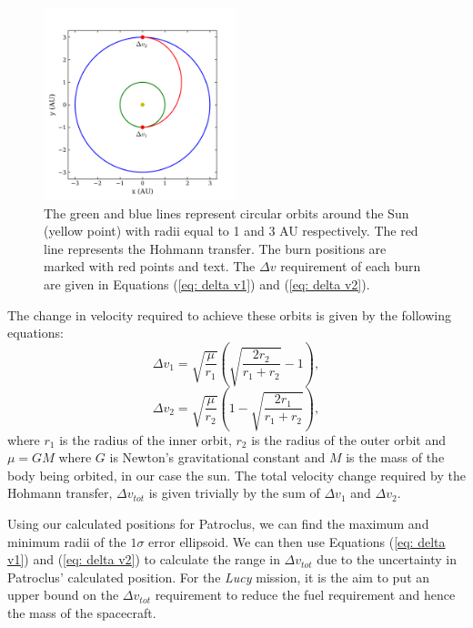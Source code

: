 \documentclass[10pt, twocolumn]{revtex4}    %
\begin{document}
\begin{figure}[h!]
\centering
\includegraphics[width=0.5\textwidth]{20180410_200052_HOHMANN_TRANSFER_EXAMPLE}
\caption{The green and blue lines represent circular orbits around the Sun (yellow point) with radii equal to 1 and 3 AU respectively. The red line represents the Hohmann transfer. The burn positions are marked with red points and text. The $\Delta v$ requirement of each burn are given in Equations (\ref{eq: delta v1}) and (\ref{eq: delta v2}).}
\label{fig: hohmann trasnfer}
\end{figure}

The change in velocity required to achieve these orbits is given by the following equations:
\begin{equation} \label{eq: delta v1}
\Delta v_1 = \sqrt{\frac{\mu}{r_1}}\left( \sqrt{\frac{2r_2}{r_1+r_2}}-1 \right),
\end{equation} 
\begin{equation} \label{eq: delta v2}
\Delta v_2 = \sqrt{\frac{\mu}{r_2}}\left( 1- \sqrt{\frac{2r_1}{r_1+r_2}} \right),
\end{equation} 
where $r_1$ is the radius of the inner orbit, $r_2$ is the radius of the outer orbit and $\mu = GM$ where $G$ is Newton's gravitational constant and $M$ is the mass of the body being orbited, in our case the sun. The total velocity change required by the Hohmann transfer, $\Delta v_{tot}$ is given trivially by the sum of $\Delta v_1$ and $\Delta v_2$.

Using our calculated positions for Patroclus, we can find the maximum and minimum radii of the $1\sigma$ error ellipsoid. We can then use Equations (\ref{eq: delta v1}) and (\ref{eq: delta v2}) to calculate the range in $\Delta v_{tot}$ due to the uncertainty in Patroclus' calculated position. For the \textit{Lucy} mission, it is the aim to put an upper bound on the $\Delta v_{tot}$ requirement to reduce the fuel requirement and hence the mass of the spacecraft.
\end{document}
